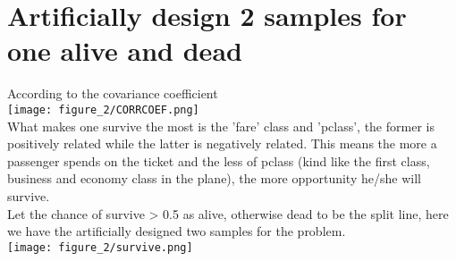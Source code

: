 \documentclass[11pt, a4paper]{article} %
\begin{document}
\section{Artificially design 2 samples for one alive and dead}
According to the covariance coefficient
\\ \texttt{[image: figure\_2/CORRCOEF.png]}
\\ What makes one survive the most is the 'fare' class and 'pclass', the former is positively related while the latter is negatively related. This means the more a passenger spends on the ticket and the less of pclass (kind like the first class, business and economy class in the plane), the more opportunity he/she will survive.
\\ Let the chance of survive > 0.5 as alive, otherwise dead to be the split line, here we have the artificially designed two samples for the problem.
\\ \texttt{[image: figure\_2/survive.png]}
\end{document}
